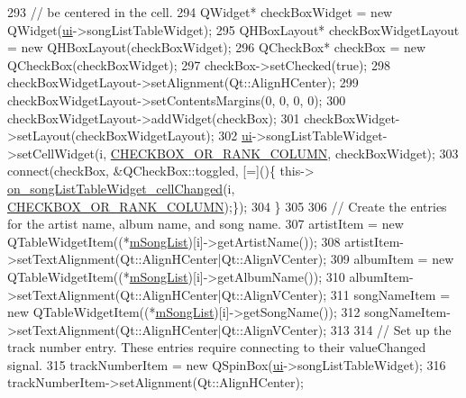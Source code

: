 \begin{DoxyCode}
{293             \textcolor{comment}{// be centered in the cell.}
294             QWidget* checkBoxWidget = \textcolor{keyword}{new} QWidget(\mbox{\hyperlink{class_song_list_viewer_window_ac24fa09133b92a7b4cbd757f9b84258d}{ui}}->songListTableWidget);
295             QHBoxLayout* checkBoxWidgetLayout = \textcolor{keyword}{new} QHBoxLayout(checkBoxWidget);
296             QCheckBox* checkBox = \textcolor{keyword}{new} QCheckBox(checkBoxWidget);
297             checkBox->setChecked(\textcolor{keyword}{true});
298             checkBoxWidgetLayout->setAlignment(Qt::AlignHCenter);
299             checkBoxWidgetLayout->setContentsMargins(0, 0, 0, 0);
300             checkBoxWidgetLayout->addWidget(checkBox);
301             checkBoxWidget->setLayout(checkBoxWidgetLayout);
302             \mbox{\hyperlink{class_song_list_viewer_window_ac24fa09133b92a7b4cbd757f9b84258d}{ui}}->songListTableWidget->setCellWidget(i, \mbox{\hyperlink{songlistviewerwindow_8h_a43772c536452cd8ed0af845b585487bf}{CHECKBOX\_OR\_RANK\_COLUMN}}, 
      checkBoxWidget);
303             connect(checkBox, &QCheckBox::toggled, [=]()\{ this->
      \mbox{\hyperlink{class_song_list_viewer_window_a51be8e61dee777db1408d4cd7da57070}{on\_songListTableWidget\_cellChanged}}(i, 
      \mbox{\hyperlink{songlistviewerwindow_8h_a43772c536452cd8ed0af845b585487bf}{CHECKBOX\_OR\_RANK\_COLUMN}});\});
304         \}
305 
306         \textcolor{comment}{// Create the entries for the artist name, album name, and song name.}
307         artistItem = \textcolor{keyword}{new} QTableWidgetItem((*\mbox{\hyperlink{class_song_list_viewer_window_a02558cb095f356a1288e5663bc2e1955}{mSongList}})[i]->getArtistName());
308         artistItem->setTextAlignment(Qt::AlignHCenter|Qt::AlignVCenter);
309         albumItem = \textcolor{keyword}{new} QTableWidgetItem((*\mbox{\hyperlink{class_song_list_viewer_window_a02558cb095f356a1288e5663bc2e1955}{mSongList}})[i]->getAlbumName());
310         albumItem->setTextAlignment(Qt::AlignHCenter|Qt::AlignVCenter);
311         songNameItem = \textcolor{keyword}{new} QTableWidgetItem((*\mbox{\hyperlink{class_song_list_viewer_window_a02558cb095f356a1288e5663bc2e1955}{mSongList}})[i]->getSongName());
312         songNameItem->setTextAlignment(Qt::AlignHCenter|Qt::AlignVCenter);
313 
314         \textcolor{comment}{// Set up the track number entry. These entries require connecting to their valueChanged signal.}
315         trackNumberItem = \textcolor{keyword}{new} QSpinBox(\mbox{\hyperlink{class_song_list_viewer_window_ac24fa09133b92a7b4cbd757f9b84258d}{ui}}->songListTableWidget);
316         trackNumberItem->setAlignment(Qt::AlignHCenter);
}
\end{DoxyCode}

